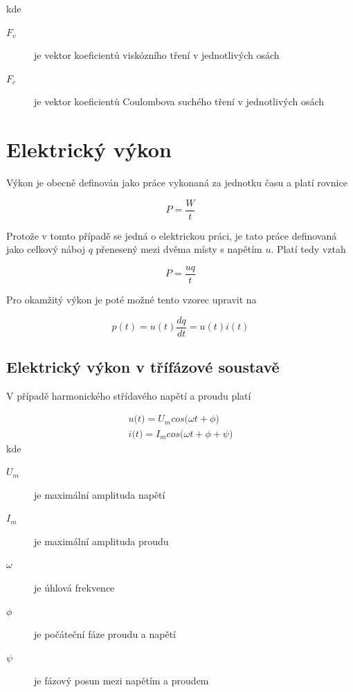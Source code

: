 kde

\begin{description}
\item[$F_v$] je vektor koeficientů viskózního tření v jednotlivých osách
\item[$F_c$] je vektor koeficientů Coulombova suchého tření v jednotlivých osách
\end{description}

\section{Elektrický výkon}
\label{el_vykon_ch}
Výkon je obecně definován jako práce vykonaná za jednotku času a platí rovnice

\begin{equation}
P = \frac{W}{t}
\end{equation}

Protože v tomto případě se jedná o elektrickou práci, je tato práce definovaná jako celkový náboj $q$ přenesený mezi dvěma místy s napětím $u$. Platí tedy vztah

\begin{equation}
P = \frac{uq}{t}
\end{equation}

Pro okamžitý výkon je poté možné tento vzorec upravit na

\begin{equation}
p(t) = u(t)\frac{dq}{dt} = u(t)i(t)
\end{equation}

\subsection{Elektrický výkon v třífázové soustavě}

V případě harmonického střídavého napětí a proudu platí

\begin{equation}
\begin{split}
u\big(t\big) = U_m cos\big(\omega t + \phi\big) \\
i\big(t\big) = I_m cos\big(\omega t + \phi + \psi\big)
\end{split}
\label{harm_curr_volt_eq}
\end{equation}  
kde
\begin{description}
\item[$U_m$] je maximální amplituda napětí
\item[$I_m$] je maximální amplituda proudu
\item[$\omega$] je úhlová frekvence
\item[$\phi$] je počáteční fáze proudu a napětí
\item[$\psi$] je fázový posun mezi napětím a proudem
\end{description}

